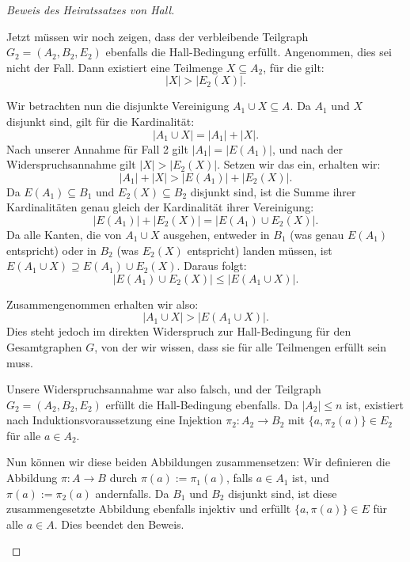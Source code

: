 \begin{proof}[Beweis des Heiratssatzes von Hall]
\begin{spoken-clean}[01:15:02 - 01:17:32]
Jetzt müssen wir noch zeigen, dass der verbleibende Teilgraph $G_2 = (A_2, B_2, E_2)$ ebenfalls die Hall-Bedingung erfüllt. Angenommen, dies sei nicht der Fall. Dann existiert eine Teilmenge $X \subseteq A_2$, für die gilt:
\[
|X| > |E_2(X)|.
\]
\end{spoken-clean}

\begin{spoken-clean}[01:17:32 - 01:20:02]
Wir betrachten nun die disjunkte Vereinigung $A_1 \cup X \subseteq A$. Da $A_1$ und $X$ disjunkt sind, gilt für die Kardinalität:
\[
|A_1 \cup X| = |A_1| + |X|.
\]
Nach unserer Annahme für Fall 2 gilt $|A_1| = |E(A_1)|$, und nach der Widerspruchsannahme gilt $|X| > |E_2(X)|$. Setzen wir das ein, erhalten wir:
\[
|A_1| + |X| > |E(A_1)| + |E_2(X)|.
\]
Da $E(A_1) \subseteq B_1$ und $E_2(X) \subseteq B_2$ disjunkt sind, ist die Summe ihrer Kardinalitäten genau gleich der Kardinalität ihrer Vereinigung:
\[
|E(A_1)| + |E_2(X)| = |E(A_1) \cup E_2(X)|.
\]
Da alle Kanten, die von $A_1 \cup X$ ausgehen, entweder in $B_1$ (was genau $E(A_1)$ entspricht) oder in $B_2$ (was $E_2(X)$ entspricht) landen müssen, ist $E(A_1 \cup X) \supseteq E(A_1) \cup E_2(X)$. Daraus folgt:
\[
|E(A_1) \cup E_2(X)| \le |E(A_1 \cup X)|.
\]
\end{spoken-clean}

\begin{spoken-clean}[01:20:02 - 01:22:32]
Zusammengenommen erhalten wir also:
\[
|A_1 \cup X| > |E(A_1 \cup X)|.
\]
Dies steht jedoch im direkten Widerspruch zur Hall-Bedingung für den Gesamtgraphen $G$, von der wir wissen, dass sie für alle Teilmengen erfüllt sein muss.

Unsere Widerspruchsannahme war also falsch, und der Teilgraph $G_2 = (A_2, B_2, E_2)$ erfüllt die Hall-Bedingung ebenfalls. Da $|A_2| \le n$ ist, existiert nach Induktionsvoraussetzung eine Injektion $\pi_2 \colon A_2 \to B_2$ mit $\{a, \pi_2(a)\} \in E_2$ für alle $a \in A_2$.

Nun können wir diese beiden Abbildungen zusammensetzen: Wir definieren die Abbildung $\pi \colon A \to B$ durch $\pi(a) := \pi_1(a)$, falls $a \in A_1$ ist, und $\pi(a) := \pi_2(a)$ andernfalls. Da $B_1$ und $B_2$ disjunkt sind, ist diese zusammengesetzte Abbildung ebenfalls injektiv und erfüllt $\{a, \pi(a)\} \in E$ für alle $a \in A$. Dies beendet den Beweis.
\end{spoken-clean}


\end{proof}
